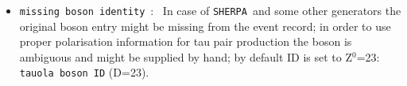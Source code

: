 \documentclass[a4paper,12pt]{article}
\newcommand{\sherpa}{{\tt SHERPA }}
\begin{document}
\begin{itemize}
{\tt tauola jak1/2  8}   - $\tau^-  \to  2\pi^-,  \pi^0,  \pi^+$\\
{\tt tauola jak1/2  9}   - $\tau^-  \to  3\pi^0,        \pi^-$\\
{\tt tauola jak1/2  10}  - $\tau^-  \to  2\pi^-,  \pi^+, 2\pi^0$ \\
{\tt tauola jak1/2  11}  - $\tau^-  \to  3\pi^-, 2\pi^+$\\
{\tt tauola jak1/2  12}  - $\tau^-  \to  3\pi^-, 2\pi^+,  \pi^0 $\\
{\tt tauola jak1/2  13}  - $\tau^-  \to  2\pi^-,  \pi^+, 3\pi^0$\\
{\tt tauola jak1/2  14}  - $\tau^-  \to  K^-, \pi^-,  K^+$\\
{\tt tauola jak1/2  15}  - $\tau^-  \to  K^0, \pi^-, \bar{K^0} $\\
{\tt tauola jak1/2  16}  - $\tau^-  \to  K^-,  K^0, \pi^0 $\\
{\tt tauola jak1/2  17}  - $\tau^-  \to  \pi^0  \pi^0   K^-$\\
{\tt tauola jak1/2  18}  - $\tau^-  \to  K^-  \pi^-  \pi^+ $\\
{\tt tauola jak1/2  19}  - $\tau^-  \to  \pi^- \bar{K^0}  \pi^0  $\\
{\tt tauola jak1/2  20}  - $\tau^-  \to  \eta  \pi^-  \pi^0$\\
{\tt tauola jak1/2  21}  - $\tau^-  \to  \pi^-  \pi^0  \gamma$\\
{\tt tauola jak1/2  22}  - $\tau^-  \to  K^-  K^0$

\item{\tt missing boson identity}\ : \ In case of \sherpa and some other generators the
original boson entry might be missing from the event record; in order
to use proper polarisation information for tau pair production the
boson is ambiguous and might be supplied by hand; by default ID is set
to Z$^0$=23:\\ {\tt tauola boson ID} (D=23).
\end{itemize}
\end{document}

